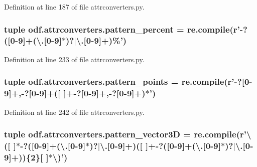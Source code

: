 Definition at line 187 of file attrconverters.\+py.

\hypertarget{namespaceodf_1_1attrconverters_a579361611ccfad779029c701add3beac}{
\subsubsection[{pattern\+\_\+percent}]{\setlength{\rightskip}{0pt plus 5cm}tuple odf.\+attrconverters.\+pattern\+\_\+percent = re.\+compile(r'-\/?(\mbox{[}0-\/9\mbox{]}+(\textbackslash{}.\mbox{[}0-\/9\mbox{]}$\ast$)?$\vert$\textbackslash{}.\mbox{[}0-\/9\mbox{]}+)\%')}}\label{namespaceodf_1_1attrconverters_a579361611ccfad779029c701add3beac}


Definition at line 233 of file attrconverters.\+py.

\hypertarget{namespaceodf_1_1attrconverters_aba1cc76213c8ca3e229a93e09ac6f4ee}{
\subsubsection[{pattern\+\_\+points}]{\setlength{\rightskip}{0pt plus 5cm}tuple odf.\+attrconverters.\+pattern\+\_\+points = re.\+compile(r'-\/?\mbox{[}0-\/9\mbox{]}+,-\/?\mbox{[}0-\/9\mbox{]}+(\mbox{[} \mbox{]}+-\/?\mbox{[}0-\/9\mbox{]}+,-\/?\mbox{[}0-\/9\mbox{]}+)$\ast$')}}\label{namespaceodf_1_1attrconverters_aba1cc76213c8ca3e229a93e09ac6f4ee}


Definition at line 242 of file attrconverters.\+py.

\hypertarget{namespaceodf_1_1attrconverters_adcdf5feb55fad2176b65fc447fae6957}{
\subsubsection[{pattern\+\_\+vector3\+D}]{\setlength{\rightskip}{0pt plus 5cm}tuple odf.\+attrconverters.\+pattern\+\_\+vector3\+D = re.\+compile(r'\textbackslash{}(\mbox{[} \mbox{]}$\ast$-\/?(\mbox{[}0-\/9\mbox{]}+(\textbackslash{}.\mbox{[}0-\/9\mbox{]}$\ast$)?$\vert$\textbackslash{}.\mbox{[}0-\/9\mbox{]}+)(\mbox{[} \mbox{]}+-\/?(\mbox{[}0-\/9\mbox{]}+(\textbackslash{}.\mbox{[}0-\/9\mbox{]}$\ast$)?$\vert$\textbackslash{}.\mbox{[}0-\/9\mbox{]}+))\{2\}\mbox{[} \mbox{]}$\ast$\textbackslash{})')}}\label{namespaceodf_1_1attrconverters_adcdf5feb55fad2176b65fc447fae6957}


